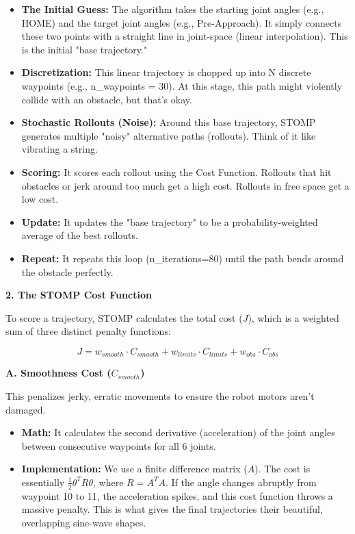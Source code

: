 \documentclass[11pt, a4paper]{article}
\begin{document}
\begin{itemize}
    \item \textbf{The Initial Guess:} The algorithm takes the starting joint angles (e.g., HOME) and the target joint angles (e.g., Pre-Approach). It simply connects these two points with a straight line in joint-space (linear interpolation). This is the initial "base trajectory."
    \item \textbf{Discretization:} This linear trajectory is chopped up into N discrete waypoints (e.g., n\_waypoints = 30). At this stage, this path might violently collide with an obstacle, but that's okay.
    \item \textbf{Stochastic Rollouts (Noise):} Around this base trajectory, STOMP generates multiple "noisy" alternative paths (rollouts). Think of it like vibrating a string.
    \item \textbf{Scoring:} It scores each rollout using the Cost Function. Rollouts that hit obstacles or jerk around too much get a high cost. Rollouts in free space get a low cost.
    \item \textbf{Update:} It updates the "base trajectory" to be a probability-weighted average of the best rollouts.
    \item \textbf{Repeat:} It repeats this loop (n\_iterations=80) until the path bends around the obstacle perfectly.
\end{itemize}

\vspace{0.4cm}
{\large\textbf{2. The STOMP Cost Function}}

To score a trajectory, STOMP calculates the total cost ($J$), which is a weighted sum of three distinct penalty functions:

\begin{equation*}
J = w_{smooth} \cdot C_{smooth} + w_{limits} \cdot C_{limits} + w_{obs} \cdot C_{obs}
\end{equation*}

\vspace{0.2cm}
\textbf{A. Smoothness Cost ($C_{smooth}$)}

This penalizes jerky, erratic movements to ensure the robot motors aren't damaged.

\begin{itemize}
    \item \textbf{Math:} It calculates the second derivative (acceleration) of the joint angles between consecutive waypoints for all 6 joints.
    \item \textbf{Implementation:} We use a finite difference matrix ($A$). The cost is essentially $\frac{1}{2} \theta^T R \theta$, where $R = A^T A$. If the angle changes abruptly from waypoint 10 to 11, the acceleration spikes, and this cost function throws a massive penalty. This is what gives the final trajectories their beautiful, overlapping sine-wave shapes.
\end{itemize}
\end{document}
